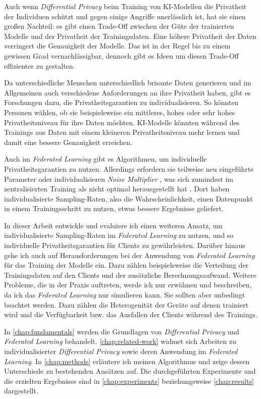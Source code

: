 Auch wenn \textit{Differential Privacy} beim Training von KI-Modellen die Privatheit der Individuen schützt und gegen einige Angriffe unerlässlich ist, hat sie einen großen Nachteil: es gibt einen Trade-Off zwischen der Güte der trainierten Modelle und der Privatheit der Trainingsdaten. Eine höhere Privatheit der Daten verringert die Genauigkeit der Modelle. Das ist in der Regel bis zu einem gewissen Grad vernachlässigbar, dennoch gibt es Ideen um diesen Trade-Off effizienter zu gestalten. 

Da unterschiedliche Menschen unterschiedlich brisante Daten generieren und im Allgemeinen auch verschiedene Anforderungen an ihre Privatheit haben, gibt es Forschungen dazu, die Privatheitsgarantien zu individualisieren. So könnten Personen wählen, ob sie beispielsweise ein mittleres, hohes oder sehr hohes Privatheitsniveau für ihre Daten möchten. KI-Modelle könnten während des Trainings aus Daten mit einem kleineren Privatheitsniveau mehr lernen und damit eine bessere Genauigkeit erreichen.

Auch im \textit{Federated Learning} gibt es Algorithmen, um individuelle Privatheitsgarantien zu nutzen. Allerdings erfordern sie teilweise neu eingeführte Parameter \parencite{shen:2023} oder individualisieren \textit{Noise Multiplier} \parencite{aldaghri:2023}, was sich zumindest im zentralisierten Training als nicht optimal herausgestellt hat \parencite{boenisch:2023}. Dort haben individualisierte Sampling-Raten, also die Wahrscheinlichkeit, einen Datenpunkt in einem Trainingsschritt zu nutzen, etwas bessere Ergebnisse geliefert.

In dieser Arbeit entwickle und evaluiere ich einen weiteren Ansatz, um individualisierte Sampling-Raten im \textit{Federated Learning} zu nutzen, und so individuelle Privatheitsgarantien für Clients zu gewährleisten. Darüber hinaus gehe ich auch auf Herausforderungen bei der Anwendung von \textit{Federated Learning} für das Training der Modelle ein. Dazu zählen beispielsweise die Verteilung der Trainingsdaten auf den Clients und der zusätzliche Berechnungsaufwand. Weitere Probleme, die in der Praxis auftreten, werde ich nur erwähnen und beschreiben, da ich das \textit{Federated Learning} nur simulieren kann. Sie sollten aber unbedingt beachtet werden. Dazu zählen die Heterogenität der Geräte auf denen trainiert wird und die Verfügbarkeit bzw. das Ausfallen der Clients während des Trainings.

In \autoref{chap:fundamentals} werden die Grundlagen von \textit{Differential Privacy} und \textit{Federated Learning} behandelt. \autoref{chap:related-work} widmet sich Arbeiten zu individualisierter \textit{Differential Privacy} sowie deren Anwendung im \textit{Federated Learning}. In \autoref{chap:methods} erläutere ich meinen Algorithmus und zeige dessen Unterschiede zu bestehenden Ansätzen auf. Die durchgeführten Experimente und die erzielten Ergebnisse sind in \autoref{chap:experiments} beziehungsweise \autoref{chap:results} dargestellt.